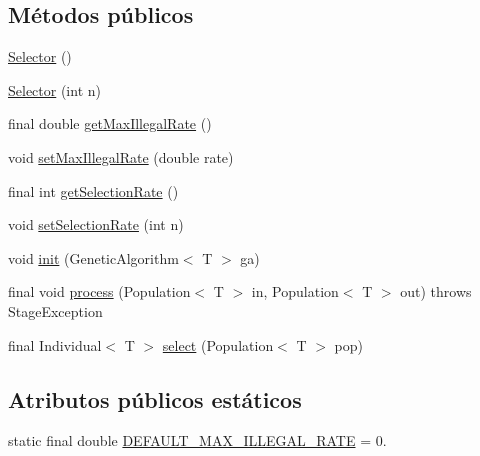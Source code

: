 \subsection*{Métodos públicos}
\begin{DoxyCompactItemize}
\item 
\hyperlink{classjenes_1_1stage_1_1operator_1_1_selector_3_01_t_01extends_01_chromosome_01_4_a83052368d6df966944bc5178f1eebed0}{Selector} ()
\item 
\hyperlink{classjenes_1_1stage_1_1operator_1_1_selector_3_01_t_01extends_01_chromosome_01_4_a07f05455c1fabfb8ad3f6468a653aed8}{Selector} (int n)
\item 
final double \hyperlink{classjenes_1_1stage_1_1operator_1_1_selector_3_01_t_01extends_01_chromosome_01_4_a6e6f7842d22da347196a8cd772bea0e1}{get\-Max\-Illegal\-Rate} ()
\item 
void \hyperlink{classjenes_1_1stage_1_1operator_1_1_selector_3_01_t_01extends_01_chromosome_01_4_a68ffd7e37d617f2f71628ce3659a8457}{set\-Max\-Illegal\-Rate} (double rate)
\item 
final int \hyperlink{classjenes_1_1stage_1_1operator_1_1_selector_3_01_t_01extends_01_chromosome_01_4_a17809883b498ec5764c5aa38d04bda8b}{get\-Selection\-Rate} ()
\item 
void \hyperlink{classjenes_1_1stage_1_1operator_1_1_selector_3_01_t_01extends_01_chromosome_01_4_aa67094343d09f80b0ce35d0f20a517d5}{set\-Selection\-Rate} (int n)
\item 
void \hyperlink{classjenes_1_1stage_1_1operator_1_1_selector_3_01_t_01extends_01_chromosome_01_4_a780969225a2e48774e71af8bd4e0063e}{init} (Genetic\-Algorithm$<$ T $>$ ga)
\item 
final void \hyperlink{classjenes_1_1stage_1_1operator_1_1_selector_3_01_t_01extends_01_chromosome_01_4_a11275bed8b009ece669a5c88c6e10b55}{process} (Population$<$ T $>$ in, Population$<$ T $>$ out)  throws Stage\-Exception 
\item 
final Individual$<$ T $>$ \hyperlink{classjenes_1_1stage_1_1operator_1_1_selector_3_01_t_01extends_01_chromosome_01_4_a9ef7b0bef2ffcb84eeb231ae37ab0239}{select} (Population$<$ T $>$ pop)
\end{DoxyCompactItemize}
\subsection*{Atributos públicos estáticos}
\begin{DoxyCompactItemize}
\item 
static final double \hyperlink{classjenes_1_1stage_1_1operator_1_1_selector_3_01_t_01extends_01_chromosome_01_4_a81263464a18d2ee1ecddf41f2e97fd89}{D\-E\-F\-A\-U\-L\-T\-\_\-\-M\-A\-X\-\_\-\-I\-L\-L\-E\-G\-A\-L\-\_\-\-R\-A\-T\-E} = 0.
\end{DoxyCompactItemize}
